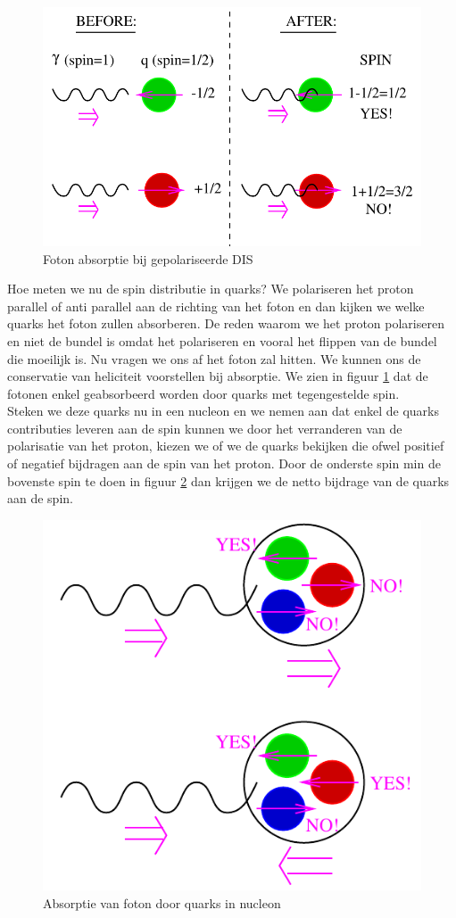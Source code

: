 \documentclass[../main.tex]{subfiles}
\begin{document}
\begin{figure}[h]
    \centering
    \includegraphics[width=0.8\linewidth]{DIS_nucleon_structuur_pdf/foton_abs_hel.png}
    \caption{Foton absorptie bij gepolariseerde DIS}%
    \label{fig:foton_abs_hel}
\end{figure}

Hoe meten we nu de spin distributie in quarks? We polariseren het proton parallel of anti parallel aan de richting van het foton en dan kijken we welke quarks het foton zullen absorberen. De reden waarom we het proton polariseren en niet de bundel is omdat het polariseren en vooral het flippen van de bundel die moeilijk is. Nu vragen we ons af het foton zal hitten. We kunnen ons de conservatie van heliciteit voorstellen bij absorptie. We zien in figuur \ref{fig:foton_abs_hel} dat de fotonen enkel geabsorbeerd worden door quarks met tegengestelde spin.\\
Steken we deze quarks nu in een nucleon en we nemen aan dat enkel de quarks contributies leveren aan de spin kunnen we door het verranderen van de polarisatie van het proton, kiezen we of we de quarks bekijken die ofwel positief of negatief bijdragen aan de spin van het proton. Door de onderste spin min de bovenste spin te doen in figuur \ref{fig:foton_abs_pol} dan krijgen we de netto bijdrage van de quarks aan de spin.

\begin{figure}[h]
    \centering
    \includegraphics[width=0.6\linewidth]{DIS_nucleon_structuur_pdf/foton_abs_pol.png}
    \caption{Absorptie van foton door quarks in nucleon}%
    \label{fig:foton_abs_pol}
\end{figure}
\end{document}
